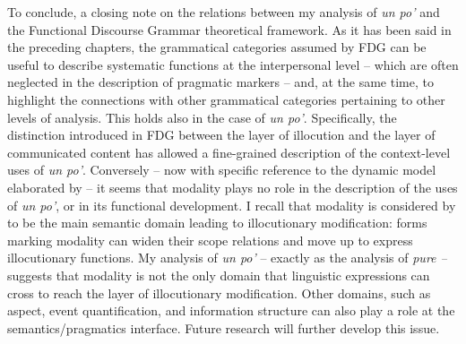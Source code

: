 To conclude, a closing note on the relations between my analysis of \textit{un po’} and the Functional Discourse Grammar theoretical framework. As it has been said in the preceding chapters, the grammatical categories assumed by FDG can be useful to describe systematic functions at the interpersonal level – which are often neglected in the description of pragmatic markers – and, at the same time, to highlight the connections with other grammatical categories pertaining to other levels of analysis. This holds also in the case of \textit{un po’}. Specifically, the distinction introduced in FDG between the layer of illocution and the layer of communicated content has allowed a fine-grained description of the context-level uses of \textit{un po’}. Conversely – now with specific reference to the dynamic model elaborated by \citet{Narrog2012} – it seems that modality plays no role in the description of the uses of \textit{un po’}, or in its functional development. I recall that modality is considered by \citet{Narrog2012} to be the main semantic domain leading to illocutionary modification: forms marking modality can widen their scope relations and move up to express illocutionary functions. My analysis of \textit{un po’} – exactly as the analysis of \textit{pure –} suggests that modality is not the only domain that linguistic expressions can cross to reach the layer of illocutionary modification. Other domains, such as aspect, event quantification, and information structure can also play a role at the semantics/pragmatics interface. Future research will further develop this issue.


